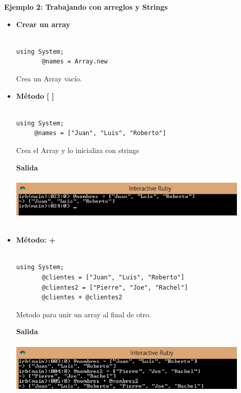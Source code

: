 \documentclass[11pt]{article} %
\begin{document}
 {\fontsize{14}{0} \bf Ejemplo 2: Trabajando con arreglos y Strings \\ }
\begin{itemize}

      \item {\bf Crear un array}\\\\
\begin{lstlisting}[frame=single]  % Start your code-block
using System;
       @names = Array.new
\end{lstlisting}
\begin{center}   
Crea un Array vacío.\\
\end{center}

      \item {\bf Método [ ]} \\\\
\begin{lstlisting}[frame=single]  % Start your code-block
using System;
     @names = ["Juan", "Luis", "Roberto"]
\end{lstlisting}
\begin{center}
Crea el Array y lo inicializa con strings
\end{center}
\bf Salida\\\\
    \includegraphics[width=0.9\textwidth]{./imagenes/InicializarArray}\\\\

\newpage

      \item {\bf Método: +}\\\\
\begin{lstlisting}[frame=single]  % Start your code-block
using System;
       @clientes = ["Juan", "Luis", "Roberto"]
       @clientes2 = ["Pierre", "Joe", "Rachel"]
       @clientes + @clientes2
\end{lstlisting}
\begin{center}   
Metodo para unir un array al final de otro.
\end{center}
\bf Salida\\\\
    \includegraphics[width=0.9\textwidth]{./imagenes/Metodo+}\\\\
        


\end{itemize}
\end{document}
